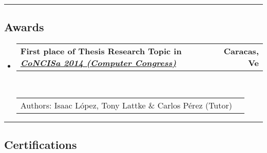\documentclass[10pt,letterpaper]{article}
\makeatletter
\newcommand{\headerrow}[2]
{\begin{tabular*}{\linewidth}{l@{\extracolsep{\fill}}r}
	#1 &
	#2 \\
\end{tabular*}}
\makeatother
\begin{document}
\hrule
\vspace{-0.4em}
\subsection*{Awards}

\begin{itemize}
  \parskip=0.1em
\item 
   \headerrow
   {\textbf{First place of Thesis Research Topic in \emph{\href{http://www.concisa.net.ve/2014/}{CoNCISa 2014 (Computer Congress)}}}}
   {\textbf{Caracas, Ve}}
  \\
  \headerrow
   {Authors: Isaac López, Tony Lattke \& Carlos Pérez (Tutor)}{}
\end{itemize}

\hrule
\vspace{-0.4em}
\subsection*{Certifications}
\end{document}
